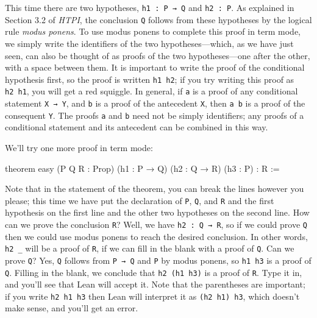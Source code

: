 \documentclass[
  letterpaper,
  DIV=11,
  numbers=noendperiod]{scrreprt}
\newenvironment{Shaded}{\begin{snugshade}}{\end{snugshade}}
\newcommand{\KeywordTok}[1]{\textcolor[rgb]{0.00,0.23,0.31}{#1}}
\newcommand{\NormalTok}[1]{\textcolor[rgb]{0.00,0.23,0.31}{#1}}
\renewcommand{\KeywordTok}[1]{\textcolor[HTML]{0000FF}{#1}}
\begin{document}
This time there are two hypotheses, \texttt{h1\ :\ P\ →\ Q} and
\texttt{h2\ :\ P}. As explained in Section 3.2 of \emph{HTPI}, the
conclusion \texttt{Q} follows from these hypotheses by the logical rule
\emph{modus ponens}. To use modus ponens to complete this proof in term
mode, we simply write the identifiers of the two hypotheses---which, as
we have just seen, can also be thought of as proofs of the two
hypotheses---one after the other, with a space between them. It is
important to write the proof of the conditional hypothesis first, so the
proof is written \texttt{h1\ h2}; if you try writing this proof as
\texttt{h2\ h1}, you will get a red squiggle. In general, if \texttt{a}
is a proof of any conditional statement \texttt{X\ →\ Y}, and \texttt{b}
is a proof of the antecedent \texttt{X}, then \texttt{a\ b} is a proof
of the consequent \texttt{Y}. The proofs \texttt{a} and \texttt{b} need
not be simply identifiers; any proofs of a conditional statement and its
antecedent can be combined in this way.

We'll try one more proof in term mode:

\begin{Shaded}
\begin{Highlighting}[]
\KeywordTok{theorem}\NormalTok{ easy (P Q R : }\KeywordTok{Prop}\NormalTok{) (h1 : P → Q)}
\NormalTok{(h2 : Q → R) (h3 : P) : R :=}
\end{Highlighting}
\end{Shaded}

Note that in the statement of the theorem, you can break the lines
however you please; this time we have put the declaration of \texttt{P},
\texttt{Q}, and \texttt{R} and the first hypothesis on the first line
and the other two hypotheses on the second line. How can we prove the
conclusion \texttt{R}? Well, we have \texttt{h2\ :\ Q\ →\ R}, so if we
could prove \texttt{Q} then we could use modus ponens to reach the
desired conclusion. In other words, \texttt{h2\ \_} will be a proof of
\texttt{R}, if we can fill in the blank with a proof of \texttt{Q}. Can
we prove \texttt{Q}? Yes, \texttt{Q} follows from \texttt{P\ →\ Q} and
\texttt{P} by modus ponens, so \texttt{h1\ h3} is a proof of \texttt{Q}.
Filling in the blank, we conclude that \texttt{h2\ (h1\ h3)} is a proof
of \texttt{R}. Type it in, and you'll see that Lean will accept it. Note
that the parentheses are important; if you write \texttt{h2\ h1\ h3}
then Lean will interpret it as \texttt{(h2\ h1)\ h3}, which doesn't make
sense, and you'll get an error.
\end{document}
